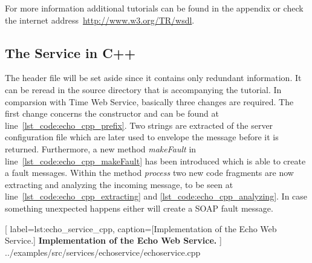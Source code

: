For more information additional tutorials can be found in the appendix or check the internet address~\href{http://www.w3.org/TR/wsdl}{http://www.w3.org/TR/wsdl}.







\subsection{The Service in C++}

The header file will be set aside since it contains only redundant information. 
It can be reread in the source directory that is accompanying the tutorial.
In comparsion with Time Web Service, basically three changes are required.
The first change concerns the constructor and can be found at line~\ref{lst_code:echo_cpp_prefix}.
Two strings are extracted of the server configuration file which are later used to envelope the message before it is returned.
Furthermore, a new method \textit{makeFault} in line~\ref{lst_code:echo_cpp_makeFault} has been introduced which is able to create a fault messages.
Within the method \textit{process} two new code fragments are now extracting and analyzing the incoming message, to be seen at line~\ref{lst_code:echo_cpp_extracting} and \ref{lst_code:echo_cpp_analyzing}.
In case something unexpected happens either will create a SOAP fault message.\\


	[
	label=lst:echo_service_cpp,
	caption={[Implementation of the Echo Web Service.]
	\textbf{Implementation of the Echo Web Service.}}
	]
{../examples/src/services/echoservice/echoservice.cpp}



